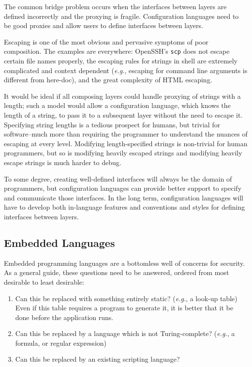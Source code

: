 \documentclass[letterpaper,twocolumn,10pt]{article}
\begin{document}
The common bridge problem occurs when the interfaces between layers are defined incorrectly and the proxying is fragile. Configuration languages need to be good proxies and allow users to define interfaces between layers.

Escaping is one of the most obvious and pervasive symptoms of poor composition. The examples are everywhere: OpenSSH's \texttt{scp} does not escape certain file names properly, the escaping rules for strings in shell are extremely complicated and context dependent (\emph{e.g.}, escaping for command line arguments is different from here-doc), and the great complexity of HTML escaping.

It would be ideal if all composing layers could handle proxying of strings with a length; such a model would allow a configuration language, which knows the length of a string, to pass it to a subsequent layer without the need to escape it. Specifying string lengths is a tedious prospect for humans, but trivial for software--much more than requiring the programmer to understand the nuances of escaping at every level. Modifying length-specified strings is non-trivial for human programmers, but so is modifying heavily escaped strings and modifying heavily escape strings is much harder to debug.

To some degree, creating well-defined interfaces will always be the domain of programmers, but configuration languages can provide better support to specify and communicate those interfaces. In the long term, configuration languages will have to develop both in-language features and conventions and styles for defining interfaces between layers.

\subsection{Embedded Languages}
Embedded programming languages are a bottomless well of concerns for security. As a general guide, these questions need to be answered, ordered from most desirable to least desirable:

\begin{enumerate}
\item Can this be replaced with something entirely static? (\emph{e.g.}, a look-up table) Even if this table requires a program to generate it, it is better that it be done before the application runs.
\item Can this be replaced by a language which is not Turing-complete? (\emph{e.g.}, a formula, or regular expression)
\item Can this be replaced by an existing scripting language?
\end{enumerate}
\end{document}

